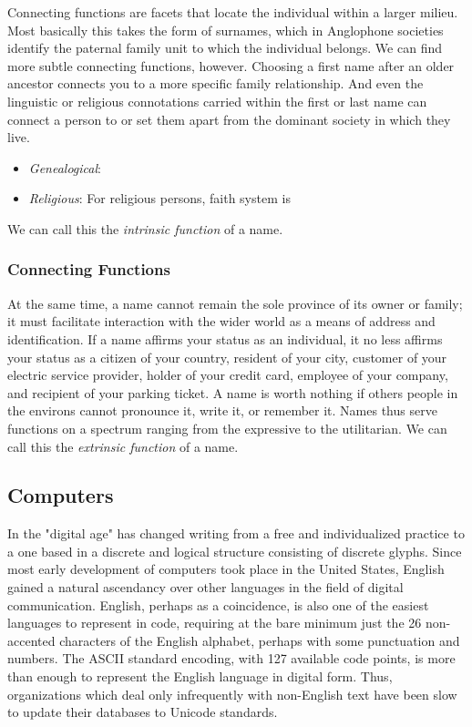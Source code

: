 Connecting functions are facets that locate the individual within a larger
milieu. Most basically this takes the form of surnames, which in Anglophone
societies identify the paternal family unit to which the individual belongs. We
can find more subtle connecting functions, however. Choosing a first name after
an older ancestor connects you to a more specific family relationship. And even
the linguistic or religious connotations carried within the first or last name
can connect a person to or set them apart from the dominant society in which
they live.

\begin{itemize}

\item \textit{Genealogical}: 

\item \textit{Religious}: For religious persons, faith system is 

\end{itemize}

We can call
this the \textit{intrinsic function} of a name.

\subsubsection{Connecting Functions}

At the same time, a name cannot remain the sole province of its owner or family;
it must facilitate interaction with the wider world as a means of address and
identification. If a name affirms your status as an individual, it no less
affirms your status as a citizen of your country, resident of your city,
customer of your electric service provider, holder of your credit card, employee
of your company, and recipient of your parking ticket. A name is worth nothing
if others people in the environs cannot pronounce it, write it, or remember it.
Names thus serve functions on a spectrum ranging from the expressive to the
utilitarian. We can call this the \textit{extrinsic function} of a name.

\subsection{Computers}

In the "digital age" has changed writing from a free and individualized practice
to a one based in a discrete and logical structure consisting of discrete
glyphs. Since most early development of computers took place in the United
States, English gained a natural ascendancy over other languages in the field of
digital communication. English, perhaps as a coincidence, is also one of the
easiest languages to represent in code, requiring at the bare minimum just the
26 non-accented characters of the English alphabet, perhaps with some
punctuation and numbers. The ASCII standard encoding, with 127 available code
points, is more than enough to represent the English language in digital form.
Thus, organizations which deal only infrequently with non-English text have been
slow to update their databases to Unicode standards.
